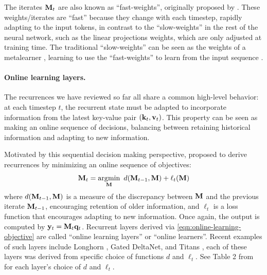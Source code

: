 \documentclass[notitlepage, 11pt]{article}
\begin{document}
The iterates $\mathbf{M}_t$ are also known as ``fast-weights'', originally proposed by \citet{Schmidhuber1992LearningControlFastWeight}.
These weights/iterates are ``fast'' because they change with each timestep, rapidly adapting to the input tokens, in contrast to the ``slow-weights'' in the rest of the neural network, such as the linear projections weights, which are only adjusted at training time.
The traditional ``slow-weights'' can be seen as the weights of a metalearner \citep{Clark2022MetaLearningFastWeight}, learning to use the ``fast-weights'' to learn from the input sequence \citep{Sun2024LearningLearnTest}.





\paragraph{Online learning layers.}
The recurrences we have reviewed so far all share a common high-level behavior: at each timestep $t$, the recurrent state must be adapted to incorporate information from the latest key-value pair $(\mathbf{k}_t, \mathbf{v}_t)$.
This property can be seen as making an online sequence of decisions, balancing between retaining historical information and adapting to new information.

Motivated by this sequential decision making perspective, \citet{Liu2024LonghornStateSpace} proposed to derive recurrences by minimizing an online sequence of objectives:
\begin{align}
    \mathbf{M}_t = \operatorname*{\arg\!\min}_{\mathbf{M}}\ d(\mathbf{M}_{t-1}, \mathbf{M}) + \ell_t(\mathbf{M}) \label{eqn:online-learning-objective}
\end{align}
where $d(\mathbf{M}_{t-1}, \mathbf{M})$ is a measure of the discrepancy between $\mathbf{M}$ and the previous iterate $\mathbf{M}_{t-1}$, encouraging retention of older information, and $\ell_t$ is a loss function that encourages adapting to new information.
Once again, the output is computed by $\mathbf{y}_t = \mathbf{M}_t\mathbf{q}_t$.
Recurrent layers derived via \autoref{eqn:online-learning-objective} are called ``online learning layers'' or ``online learners''.
Recent examples of such layers include Longhorn \citep{Liu2024LonghornStateSpace}, Gated DeltaNet\citep{Yang2024GatedDeltaNetworks}, and Titans \citep{Behrouz2024TitansLearningMemorize}, each of these layers was derived from specific choice of functions $d$ and $\ell_t$. See Table 2 from \citet{Yang2024GatedDeltaNetworks} for each layer's choice of $d$ and $\ell_t$.
\end{document}
